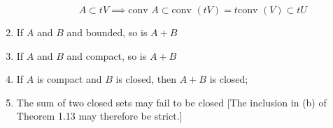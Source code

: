\begin{enumerate}
\begin{itemize}
        $$
        A\subset tV \implies \text{conv }A\subset \text{conv }(tV)= t\text{conv }(V)\subset tU
        $$

    \end{itemize}
    \item If $A$ and $B$ and bounded, so is $A+B$
    \item If $A$ and $B$ and compact, so is $A+B$
    \item If $A$ is compact and $B$ is closed, then $A+B$ is closed;
    \item The sum of two closed sets may fail to be closed [The inclusion in (b) of Theorem 1.13 may therefore be strict.]
\end{enumerate}